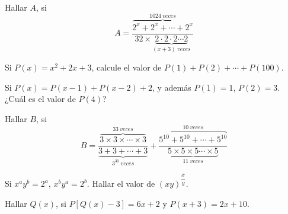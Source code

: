 \begin{section-problem}
    Hallar $A$, si
    \[
        A = \frac{\overbrace{2^x + 2^x + \cdots + 2^x}^{1024 \ veces}}{32 \times \underbrace{2 \cdot 2 \cdot 2 \cdots 2}_{(x + 3) \ veces}}
    \]
\end{section-problem}

\begin{section-problem}
    Si $P(x) = x^2 + 2x + 3$, calcule el valor de $P(1) + P(2) + \cdots + P(100).$
\end{section-problem}

\begin{section-problem}
    Si $P(x) =  P(x - 1) + P(x - 2) + 2$, y además $P(1) = 1$, $P(2) = 3$.
    ¿Cuál es el valor de $P(4)$?
\end{section-problem}

\begin{section-problem}
    Hallar $B$, si
    \[
        B = \frac{\overbrace{3 \times 3 \times \cdots \times 3}^{33 \ veces}}{\underbrace{3 + 3 +  \cdots + 3}_{3^{30}\ veces}}
        + \frac{\overbrace{5^{10} + 5^{10} + \cdots + 5^{10}}^{10 \ veces}}{\underbrace{5 \times 5 \times 5 \cdots \times 5}_{11 \ veces}}
    \]
\end{section-problem}

\begin{section-problem}
    Si $x^a y^b = 2^a$, $x^b y^a = 2^b$.
    Hallar el valor de $(xy)^{\dfrac{x}{y}}.$
\end{section-problem}

\begin{section-problem}
    Hallar $Q(x)$, si $P\left[Q(x) - 3\right] = 6x + 2$ y $P(x + 3) = 2x + 10$.
\end{section-problem}
